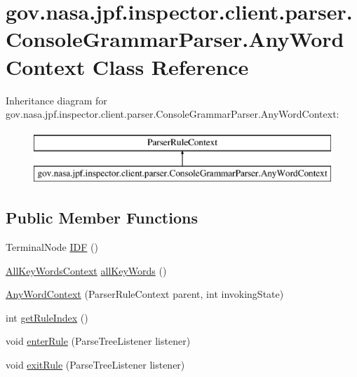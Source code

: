 \hypertarget{classgov_1_1nasa_1_1jpf_1_1inspector_1_1client_1_1parser_1_1_console_grammar_parser_1_1_any_word_context}{}\section{gov.\+nasa.\+jpf.\+inspector.\+client.\+parser.\+Console\+Grammar\+Parser.\+Any\+Word\+Context Class Reference}
\label{classgov_1_1nasa_1_1jpf_1_1inspector_1_1client_1_1parser_1_1_console_grammar_parser_1_1_any_word_context}
Inheritance diagram for gov.\+nasa.\+jpf.\+inspector.\+client.\+parser.\+Console\+Grammar\+Parser.\+Any\+Word\+Context\+:\begin{figure}[H]
\begin{center}
\leavevmode
\includegraphics[height=2.000000cm]{classgov_1_1nasa_1_1jpf_1_1inspector_1_1client_1_1parser_1_1_console_grammar_parser_1_1_any_word_context}
\end{center}
\end{figure}
\subsection*{Public Member Functions}
\begin{DoxyCompactItemize}
\item 
Terminal\+Node \hyperlink{classgov_1_1nasa_1_1jpf_1_1inspector_1_1client_1_1parser_1_1_console_grammar_parser_1_1_any_word_context_a1934a75786cf9fbbf255a7470dc13371}{I\+DF} ()
\item 
\hyperlink{classgov_1_1nasa_1_1jpf_1_1inspector_1_1client_1_1parser_1_1_console_grammar_parser_1_1_all_key_words_context}{All\+Key\+Words\+Context} \hyperlink{classgov_1_1nasa_1_1jpf_1_1inspector_1_1client_1_1parser_1_1_console_grammar_parser_1_1_any_word_context_a76c6652c2076223cd181b3419f5001f9}{all\+Key\+Words} ()
\item 
\hyperlink{classgov_1_1nasa_1_1jpf_1_1inspector_1_1client_1_1parser_1_1_console_grammar_parser_1_1_any_word_context_aa87a509c6e99e5a092ffea48f6547d2e}{Any\+Word\+Context} (Parser\+Rule\+Context parent, int invoking\+State)
\item 
int \hyperlink{classgov_1_1nasa_1_1jpf_1_1inspector_1_1client_1_1parser_1_1_console_grammar_parser_1_1_any_word_context_a0243655728f4d93cf2cb0ed02f79f8e6}{get\+Rule\+Index} ()
\item 
void \hyperlink{classgov_1_1nasa_1_1jpf_1_1inspector_1_1client_1_1parser_1_1_console_grammar_parser_1_1_any_word_context_a764539ca1084f537e0dbf8c31f5371af}{enter\+Rule} (Parse\+Tree\+Listener listener)
\item 
void \hyperlink{classgov_1_1nasa_1_1jpf_1_1inspector_1_1client_1_1parser_1_1_console_grammar_parser_1_1_any_word_context_a3a90ab7a374ffc8560bc06d4826f4fd9}{exit\+Rule} (Parse\+Tree\+Listener listener)
\end{DoxyCompactItemize}
